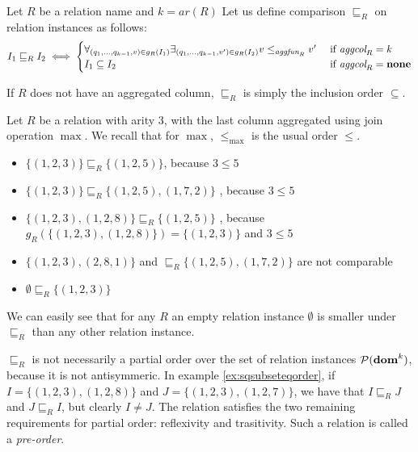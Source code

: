 \begin{defn}
Let $R$ be a relation name and $k=ar(R)$ Let us define comparison $\sqsubseteq_R$ on relation instances as follows:
$$
I_1 \sqsubseteq_R I_2 \iff
\begin{cases}
   \forall_{(q_1, ..., q_{k-1}, v) \in g_R(I_1)} \exists_{(q_1, ..., q_{k-1}, v') \in g_R(I_2)} v \le_{\textit{aggfun}_R} v' & \text{ if } \textit{aggcol}_R = k \\
   I_1 \subseteq I_2 & \text{ if } \textit{aggcol}_R = \bf{none} 
\end{cases}
$$
\end{defn}

\begin{rem}
If $R$ does not have an aggregated column, $\sqsubseteq_R$ is simply the inclusion order $\subseteq$. 
\end{rem}


\begin{exmp}
Let $R$ be a relation with arity $3$, with the last column aggregated using join operation $\max$.
We recall that for $ \max $, $ \le_{\max} $ is the usual order $ \le $.
\begin{itemize}
\item $\{(1, 2, 3)\} \sqsubseteq_R \{(1, 2, 5)\}$, because $3 \le 5$
\item $\{(1, 2, 3)\} \sqsubseteq_R \{(1, 2, 5), (1, 7, 2)\}$ , because $3 \le 5$
\item $\{(1, 2, 3), (1, 2, 8)\} \sqsubseteq_R \{(1, 2, 5)\}$ , because $g_R(\{(1, 2, 3), (1, 2, 8)\}) = \{(1,2,3)\}$ and $3 \le 5$
\item $\{(1, 2, 3), (2, 8, 1)\}$ and  $\sqsubseteq_R \{(1, 2, 5), (1, 7, 2)\}$ are not comparable
\item $\emptyset \sqsubseteq_R \{(1, 2, 3)\}$
\end{itemize}
\end{exmp}\label{ex:sqsubseteqorder}

We can easily see that for any $R$ an empty relation instance $\emptyset$ is smaller under $\sqsubseteq_R$  than any other relation instance.


$\sqsubseteq_R$ is not necessarily a partial order over the set of relation instances $\mathcal{P}({\bf dom}^k)$, because it is not antisymmeric. In example \ref{ex:sqsubseteqorder}, if $I = \{(1, 2, 3), (1, 2, 8)\}$ and $J = \{(1, 2, 3), (1, 2, 7)\}$, we have that $I \sqsubseteq_R J$ and $J \sqsubseteq_R I$, but clearly $I \ne J$. The relation satisfies the two remaining requirements for partial order: reflexivity and trasitivity. Such a relation is called a \emph{pre-order}.

